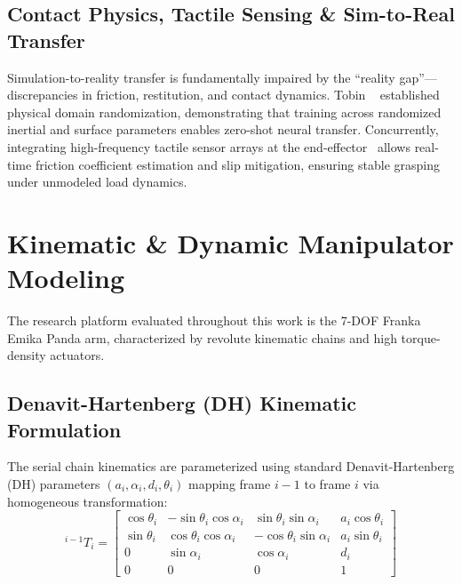 \documentclass[10pt,twocolumn,a4paper]{article}
\begin{document}
\subsection{Contact Physics, Tactile Sensing \& Sim-to-Real Transfer}
Simulation-to-reality transfer is fundamentally impaired by the ``reality gap''—discrepancies in friction, restitution, and contact dynamics. Tobin \etal~\cite{tobin2017domain} established physical domain randomization, demonstrating that training across randomized inertial and surface parameters enables zero-shot neural transfer. Concurrently, integrating high-frequency tactile sensor arrays at the end-effector~\cite{gall2021tactile} allows real-time friction coefficient estimation and slip mitigation, ensuring stable grasping under unmodeled load dynamics.

\section{Kinematic \& Dynamic Manipulator Modeling}
\label{sec:kinematics}
The research platform evaluated throughout this work is the 7-DOF Franka Emika Panda arm, characterized by revolute kinematic chains and high torque-density actuators.

\subsection{Denavit-Hartenberg (DH) Kinematic Formulation}
The serial chain kinematics are parameterized using standard Denavit-Hartenberg (DH) parameters $(a_i, \alpha_i, d_i, \theta_i)$ mapping frame $i-1$ to frame $i$ via homogeneous transformation:
\begin{equation}
  ^{i-1}T_i = \begin{bmatrix}
    \cos\theta_i & -\sin\theta_i \cos\alpha_i & \sin\theta_i \sin\alpha_i & a_i \cos\theta_i \\
    \sin\theta_i & \cos\theta_i \cos\alpha_i & -\cos\theta_i \sin\alpha_i & a_i \sin\theta_i \\
    0 & \sin\alpha_i & \cos\alpha_i & d_i \\
    0 & 0 & 0 & 1
  \end{bmatrix}
  \label{eq:dh_transform}
\end{equation}
\end{document}
